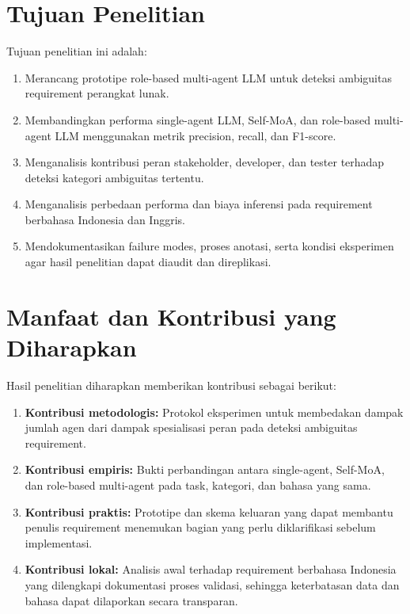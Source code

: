 \section{Tujuan Penelitian}

Tujuan penelitian ini adalah:
\begin{enumerate}
\item Merancang prototipe role-based multi-agent LLM untuk deteksi ambiguitas requirement perangkat lunak.
\item Membandingkan performa single-agent LLM, Self-MoA, dan role-based multi-agent LLM menggunakan metrik precision, recall, dan F1-score.
\item Menganalisis kontribusi peran stakeholder, developer, dan tester terhadap deteksi kategori ambiguitas tertentu.
\item Menganalisis perbedaan performa dan biaya inferensi pada requirement berbahasa Indonesia dan Inggris.
\item Mendokumentasikan failure modes, proses anotasi, serta kondisi eksperimen agar hasil penelitian dapat diaudit dan direplikasi.
\end{enumerate}

\section{Manfaat dan Kontribusi yang Diharapkan}

Hasil penelitian diharapkan memberikan kontribusi sebagai berikut:
\begin{enumerate}
\item \textbf{Kontribusi metodologis:} Protokol eksperimen untuk membedakan dampak jumlah agen dari dampak spesialisasi peran pada deteksi ambiguitas requirement.
\item \textbf{Kontribusi empiris:} Bukti perbandingan antara single-agent, Self-MoA, dan role-based multi-agent pada task, kategori, dan bahasa yang sama.
\item \textbf{Kontribusi praktis:} Prototipe dan skema keluaran yang dapat membantu penulis requirement menemukan bagian yang perlu diklarifikasi sebelum implementasi.
\item \textbf{Kontribusi lokal:} Analisis awal terhadap requirement berbahasa Indonesia yang dilengkapi dokumentasi proses validasi, sehingga keterbatasan data dan bahasa dapat dilaporkan secara transparan.
\end{enumerate}
